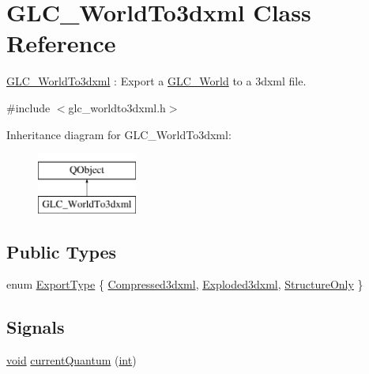 \hypertarget{class_g_l_c___world_to3dxml}{\section{G\-L\-C\-\_\-\-World\-To3dxml Class Reference}
\label{class_g_l_c___world_to3dxml}
}


\hyperlink{class_g_l_c___world_to3dxml}{G\-L\-C\-\_\-\-World\-To3dxml} \-: Export a \hyperlink{class_g_l_c___world}{G\-L\-C\-\_\-\-World} to a 3dxml file.  




{\ttfamily \#include $<$glc\-\_\-worldto3dxml.\-h$>$}

Inheritance diagram for G\-L\-C\-\_\-\-World\-To3dxml\-:\begin{figure}[H]
\begin{center}
\leavevmode
\includegraphics[height=2.000000cm]{class_g_l_c___world_to3dxml}
\end{center}
\end{figure}
\subsection*{Public Types}
\begin{DoxyCompactItemize}
\item 
enum \hyperlink{class_g_l_c___world_to3dxml_a00bd3e3fded597cda87766c5a2e12b96}{Export\-Type} \{ \hyperlink{class_g_l_c___world_to3dxml_a00bd3e3fded597cda87766c5a2e12b96aeb6c9542eea06c14c05116553ddb1941}{Compressed3dxml}, 
\hyperlink{class_g_l_c___world_to3dxml_a00bd3e3fded597cda87766c5a2e12b96a6a29a52f62c0ec5228fbc754c34e7323}{Exploded3dxml}, 
\hyperlink{class_g_l_c___world_to3dxml_a00bd3e3fded597cda87766c5a2e12b96a9a71e68d5a68bdee1391af2690a244f0}{Structure\-Only}
 \}
\end{DoxyCompactItemize}
\subsection*{Signals}
\begin{DoxyCompactItemize}
\item 
\hyperlink{group___u_a_v_objects_plugin_ga444cf2ff3f0ecbe028adce838d373f5c}{void} \hyperlink{class_g_l_c___world_to3dxml_a6c647493a85b7ae3d1e620435ebfffe3}{current\-Quantum} (\hyperlink{ioapi_8h_a787fa3cf048117ba7123753c1e74fcd6}{int})
\end{DoxyCompactItemize}
